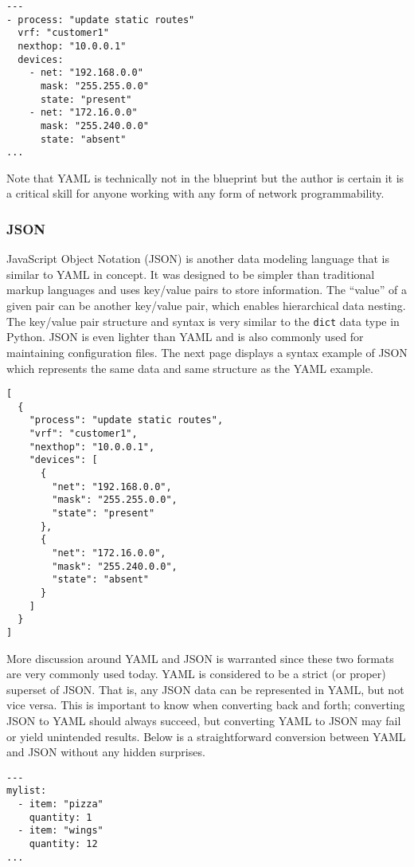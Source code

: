 \begin{verbatim}
---
- process: "update static routes"
  vrf: "customer1"
  nexthop: "10.0.0.1"
  devices:
    - net: "192.168.0.0"
      mask: "255.255.0.0"
      state: "present"
    - net: "172.16.0.0"
      mask: "255.240.0.0"
      state: "absent"
...
\end{verbatim}

Note that YAML is technically not in the blueprint but the author is certain
it is a critical skill for anyone working with any form of network programmability.

\subsubsection{JSON}
JavaScript Object Notation (JSON) is another data modeling language that is
similar to YAML in concept. It was designed to be simpler than traditional
markup languages and uses key/value pairs to store information. The ``value'' of
a given pair can be another key/value pair, which enables hierarchical data
nesting. The key/value pair structure and syntax is very similar to the
\verb|dict| data type in Python. JSON is even lighter than YAML and is also
commonly used for maintaining configuration files. The next page displays a
syntax example of JSON which represents the same data and same structure as
the YAML example.

\begin{verbatim}
[
  {
    "process": "update static routes",
    "vrf": "customer1",
    "nexthop": "10.0.0.1",
    "devices": [
      {
        "net": "192.168.0.0",
        "mask": "255.255.0.0",
        "state": "present"
      },
      {
        "net": "172.16.0.0",
        "mask": "255.240.0.0",
        "state": "absent"
      }
    ]
  }
]
\end{verbatim}

More discussion around YAML and JSON is warranted since these two formats are
very commonly used today. YAML is considered to be a strict (or proper)
superset of JSON\@. That is, any JSON data can be represented in YAML, but not
vice versa. This is important to know when converting back and forth;
converting JSON to YAML should always succeed, but converting YAML to JSON may
fail or yield unintended results. Below is a straightforward conversion
between YAML and JSON without any hidden surprises.

\begin{verbatim}
---
mylist:
  - item: "pizza"
    quantity: 1
  - item: "wings"
    quantity: 12
...
\end{verbatim}

